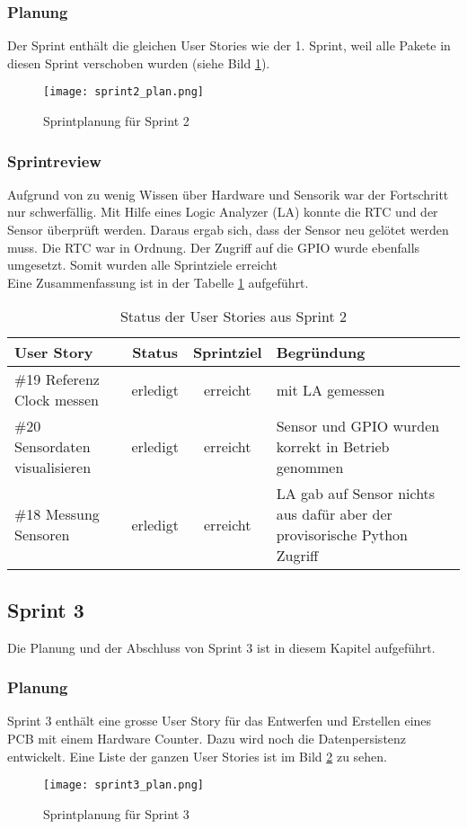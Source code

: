 \subsubsection*{Planung}
Der Sprint enthält die gleichen User Stories wie der 1. Sprint, weil alle Pakete in diesen Sprint verschoben wurden (siehe Bild \ref{fig:sprint2}).
\begin{figure}[H]
    \centering
    \texttt{[image: sprint2\_plan.png]}
    \caption{Sprintplanung für Sprint 2}
    \label{fig:sprint2}
\end{figure}
\subsubsection*{Sprintreview}
Aufgrund von zu wenig Wissen über Hardware und Sensorik war der Fortschritt nur schwerfällig. Mit Hilfe eines Logic Analyzer (LA) konnte die RTC und der Sensor überprüft werden. Daraus ergab sich, dass der Sensor neu gelötet werden muss. Die RTC war in Ordnung. Der Zugriff auf die GPIO wurde ebenfalls umgesetzt. Somit wurden alle Sprintziele erreicht\\
Eine Zusammenfassung ist in der Tabelle \ref{tab:sprint2} aufgeführt.
\begin{table}[H]
    \centering
    \begin{tabular}{lccp{7cm}}
        \textbf{User Story} &  \textbf{Status} & \textbf{Sprintziel}& \textbf{Begründung}\\\toprule[2pt]
        \#19 Referenz Clock messen & erledigt & erreicht & mit LA gemessen\\
        \#20 Sensordaten visualisieren & erledigt & erreicht & Sensor und GPIO wurden korrekt in Betrieb genommen\\
        \#18 Messung Sensoren & erledigt & erreicht & LA gab auf Sensor nichts aus dafür aber der provisorische Python Zugriff\\
    \end{tabular}
    \caption{Status der User Stories aus Sprint 2}
    \label{tab:sprint2}
\end{table}

\clearpage
\subsection*{Sprint 3}
Die Planung und der Abschluss von Sprint 3 ist in diesem Kapitel aufgeführt.
\subsubsection*{Planung}
Sprint 3 enthält eine grosse User Story für das Entwerfen und Erstellen eines PCB mit einem Hardware Counter. Dazu wird noch die Datenpersistenz entwickelt. Eine Liste der ganzen User Stories ist im Bild \ref{fig:sprint3} zu sehen.
\begin{figure}[H]
    \centering
    \texttt{[image: sprint3\_plan.png]}
    \caption{Sprintplanung für Sprint 3}
    \label{fig:sprint3}
\end{figure}
